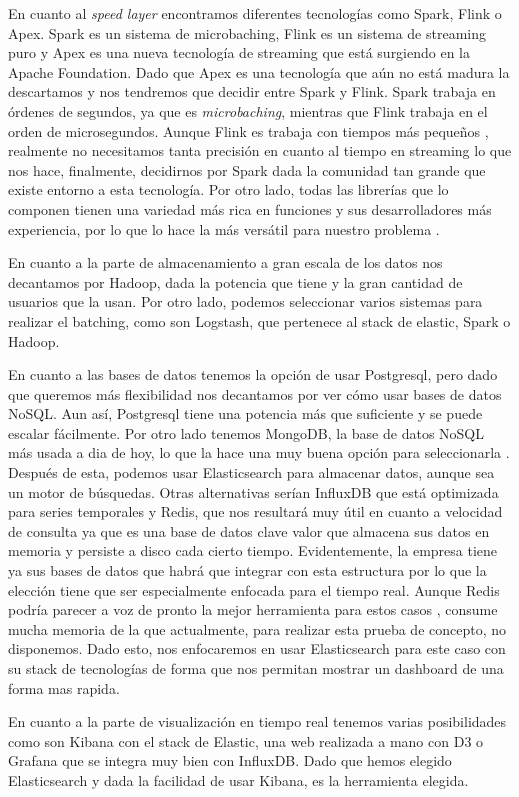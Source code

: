 En cuanto al {\em speed layer} encontramos diferentes tecnologías como
Spark, Flink o Apex. Spark es un sistema de microbaching, Flink es un
sistema de streaming puro y Apex es una nueva tecnología de streaming que
está surgiendo en la Apache Foundation. Dado que Apex es una tecnología que
aún no está madura la descartamos y nos tendremos que decidir entre Spark y
Flink. Spark trabaja en órdenes de segundos, ya que es {\em microbaching},
mientras que Flink trabaja en el orden de microsegundos. Aunque Flink es
trabaja con tiempos más pequeños \cite{Hrr-4}, realmente no necesitamos
tanta precisión en cuanto al tiempo en streaming lo que nos hace,
finalmente, decidirnos por Spark dada la comunidad tan grande que existe
entorno a esta tecnología. Por otro lado, todas las librerías que lo
componen tienen una variedad más rica en funciones y sus desarrolladores
más experiencia, por lo que lo hace la más versátil para nuestro problema
\cite{Hrr-3}.

En cuanto a la parte de almacenamiento a gran escala de los datos nos
decantamos por Hadoop, dada la potencia que tiene y la gran cantidad de
usuarios que la usan. Por otro lado, podemos seleccionar varios sistemas
para realizar el batching, como son Logstash, que pertenece al stack de
elastic, Spark o Hadoop.

En cuanto a las bases de datos tenemos la opción de usar Postgresql, pero
dado que queremos más flexibilidad nos decantamos por ver cómo usar bases
de datos NoSQL. Aun así, Postgresql tiene una potencia más que suficiente y
se puede escalar fácilmente. Por otro lado tenemos MongoDB, la base de
datos NoSQL más usada a dia de hoy, lo que la hace una muy buena opción
para seleccionarla \cite{Hrr-5}. Después de esta, podemos usar
Elasticsearch para almacenar datos, aunque sea un motor de búsquedas. Otras
alternativas serían InfluxDB que está optimizada para series temporales y
Redis, que nos resultará muy útil en cuanto a velocidad de consulta ya que
es una base de datos clave valor que almacena sus datos en memoria y
persiste a disco cada cierto tiempo. Evidentemente, la empresa tiene ya sus
bases de datos que habrá que integrar con esta estructura por lo que la
elección tiene que ser especialmente enfocada para el tiempo real. Aunque
Redis podría parecer a voz de pronto la mejor herramienta para estos casos
\cite{Hrr-6}, consume mucha memoria de la que actualmente, para realizar
esta prueba de concepto, no disponemos. Dado esto, nos enfocaremos en usar
Elasticsearch para este caso con su stack de tecnologías de forma que nos
permitan mostrar un dashboard de una forma mas rapida.

En cuanto a la parte de visualización en tiempo real tenemos varias
posibilidades como son Kibana con el stack de Elastic, una web realizada a
mano con D3 o Grafana que se integra muy bien con InfluxDB. Dado que hemos
elegido Elasticsearch y dada la facilidad de usar Kibana, es la herramienta
elegida.

